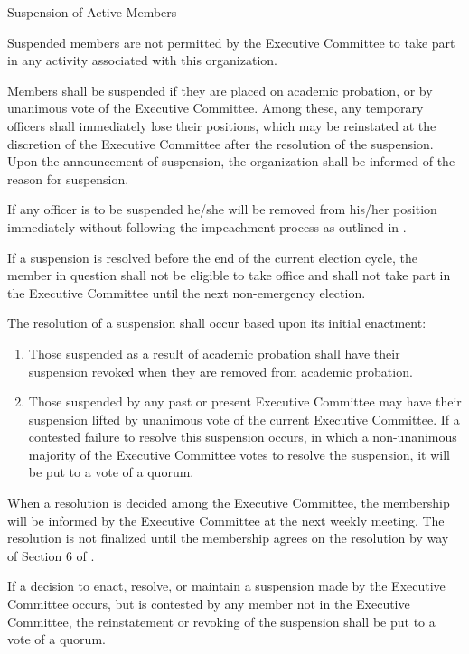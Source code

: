 {
\begin{article}{Suspension of Active Members}
	\item Suspended members are not permitted by the Executive Committee to take part in any activity associated with this organization.
	\item Members shall be suspended if they are placed on academic probation, or by unanimous vote of the Executive Committee.  Among these, any temporary officers shall immediately lose their positions, which may be reinstated at the discretion of the Executive Committee after the resolution of the suspension.  Upon the announcement of suspension, the organization shall be informed of the reason for suspension.
	\item If any officer is to be suspended he/she will be removed from his/her position immediately without following the impeachment process as outlined in .
	\item If a suspension is resolved before the end of the current election cycle, the member in question shall not be eligible to take office and shall not take part in the Executive Committee until the next non-emergency election.
	\item The resolution of a suspension shall occur based upon its initial enactment:
	\begin{enumerate}
		\item Those suspended as a result of academic probation shall have their suspension revoked when they are removed from academic probation.
		\item Those suspended by any past or present Executive Committee may have their suspension lifted by unanimous vote of the current Executive Committee.  If a contested failure to resolve this suspension occurs, in which a non-unanimous majority of the Executive Committee votes to resolve the suspension, it will be put to a vote of a quorum.
	\end{enumerate}
	When a resolution is decided among the Executive Committee, the membership will be informed by the Executive Committee at the next weekly meeting.  The resolution is not finalized until the membership agrees on the resolution by way of Section 6 of .
	\item If a decision to enact, resolve, or maintain a suspension made by the Executive Committee occurs, but is contested by any member not in the Executive Committee, the reinstatement or revoking of the suspension shall be put to a vote of a quorum.
\end{article}
}